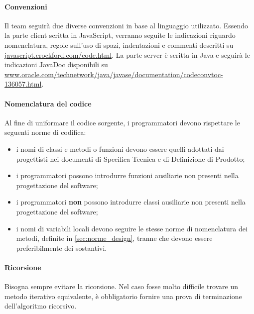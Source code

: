 	\paragraph{Convenzioni} \label{sec:conv}
	Il team seguirà due diverse convenzioni in base al linguaggio utilizzato. Essendo la parte client scritta in JavaScript, verranno seguite le indicazioni riguardo nomenclatura, regole sull'uso di spazi, indentazioni e commenti descritti su \url{javascript.crockford.com/code.html}. La parte server è scritta in Java e seguirà le indicazioni JavaDoc disponibili su \url{www.oracle.com/technetwork/java/javase/documentation/codeconvtoc-136057.html}.
	
	\paragraph{Nomenclatura del codice}
	Al fine di uniformare il codice sorgente, i programmatori devono rispettare le seguenti norme di codifica:
	\begin{itemize}
		\item i nomi di classi e metodi o funzioni devono essere quelli adottati dai progettisti nei documenti di Specifica Tecnica e di Definizione di Prodotto;
		\item i programmatori possono introdurre funzioni ausiliarie non presenti nella progettazione del software;
		\item i programmatori \textbf{non} possono introdurre classi ausiliarie non presenti nella progettazione del software;
		\item i nomi di variabili locali devono seguire le stesse norme di nomenclatura dei metodi, definite in \ref{sec:norme_design}, tranne che devono essere preferibilmente dei sostantivi.
	\end{itemize}
	
	\paragraph{Ricorsione}
	Bisogna sempre evitare la ricorsione. Nel caso fosse molto difficile trovare un metodo iterativo equivalente, è obbligatorio fornire una prova di terminazione dell'algoritmo ricorsivo.

